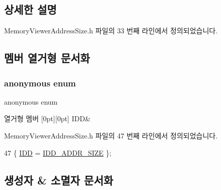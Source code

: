 \subsection{상세한 설명}


Memory\+Viewer\+Address\+Size.\+h 파일의 33 번째 라인에서 정의되었습니다.



\subsection{멤버 열거형 문서화}
\mbox{\label{class_memory_viewer_address_size_a20a7438413cb28be1f8a838f6f07dd1a}} 
\subsubsection{\texorpdfstring{anonymous enum}{anonymous enum}}
{\footnotesize\ttfamily anonymous enum}

\begin{DoxyEnumFields}{열거형 멤버}
[0pt][0pt]{}\mbox{\label{class_memory_viewer_address_size_a20a7438413cb28be1f8a838f6f07dd1aaf952aee8c8eac701dc1be256e60f4753}} 
I\+DD&\\
\hline

\end{DoxyEnumFields}


Memory\+Viewer\+Address\+Size.\+h 파일의 47 번째 라인에서 정의되었습니다.


\begin{DoxyCode}
47 \{ \mbox{\hyperlink{class_memory_viewer_address_size_a20a7438413cb28be1f8a838f6f07dd1aaf952aee8c8eac701dc1be256e60f4753}{IDD}} = \mbox{\hyperlink{resource_8h_a22e91911dc77b31220039dea0e1b81b8}{IDD\_ADDR\_SIZE}} \};
\end{DoxyCode}


\subsection{생성자 \& 소멸자 문서화}
\mbox{\label{class_memory_viewer_address_size_a84ec64f3339841082887f5566ce68d19}} 
